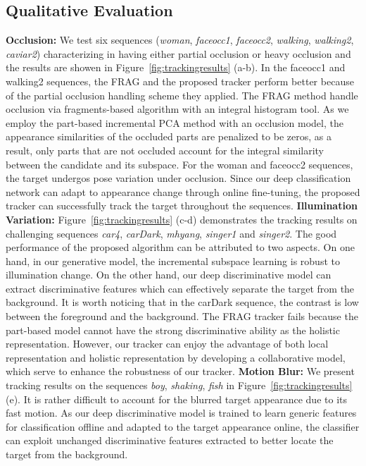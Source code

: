\documentclass[preprint,12pt,review]{elsarticle}
\begin{document}
\subsection{Qualitative Evaluation} \label{QE}{\flushleft \bf{Occlusion:}}
We test six sequences (\emph{woman}, \emph{faceocc1}, \emph{faceocc2}, \emph{walking}, \emph{walking2}, \emph{caviar2}) characterizing in having either partial occlusion or heavy occlusion and the results are showen in Figure~\ref{fig:trackingresults} (a-b).
%
In the faceocc1 and walking2 sequences, the FRAG and the proposed tracker perform better because of the partial occlusion handling scheme they applied.
%
The FRAG method handle occlusion via fragments-based algorithm with an integral histogram tool.
%
As we employ the part-based incremental PCA method with an occlusion model, the appearance similarities of the occluded parts are penalized to be zeros, as a result, only parts that are not occluded account for the integral similarity between the candidate and its subspace.
%
For the woman and faceocc2 sequences, the target undergos pose variation under occlusion.
%
Since our deep classification network can adapt to appearance change through online fine-tuning, the proposed tracker can successfully track the target throughout the sequences.
%
{\flushleft \bf{Illumination Variation:}}
Figure~\ref{fig:trackingresults} (c-d) demonstrates the tracking results on challenging sequences \emph{car4}, \emph{carDark}, \emph{mhyang}, \emph{singer1} and \emph{singer2}.
%
The good performance of the proposed algorithm can be attributed to two aspects.
%
On one hand, in our generative model, the incremental subspace learning is robust to illumination change.
%
On the other hand, our deep discriminative model can extract discriminative features which can effectively separate the target from the background.
%
It is worth noticing that in the carDark sequence, the contrast is low between the foreground and the background.
%
The FRAG tracker fails because the part-based model cannot have the strong discriminative ability as the holistic representation.
%
However, our tracker can enjoy the advantage of both local representation and holistic representation by developing a collaborative model, which serve to enhance the robustness of our tracker.
{\flushleft \bf{Motion Blur:}}
We present tracking results on the sequences \emph{boy}, \emph{shaking}, \emph{fish} in Figure~\ref{fig:trackingresults} (e).
%
It is rather difficult to account for the blurred target appearance due to its fast motion.
%
As our deep discriminative model is trained to learn generic features for classification offline and adapted to the target appearance online, the classifier can exploit unchanged discriminative features extracted to better locate the target from the background.
\end{document}
